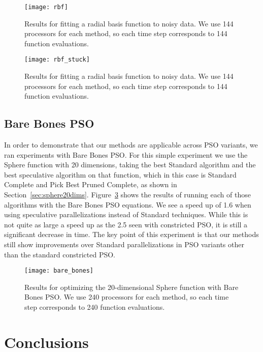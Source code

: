 \documentclass[smallcondensed]{svjour3}
\renewcommand{\sec}[1]{Section~\ref{sec:#1}}
\newcommand{\fig}[1]{Figure~\ref{fig:#1}}
\begin{document}
\begin{figure}
  \centering
  \texttt{[image: rbf]}
  \caption{Results for fitting a radial basis function to noisy data.  We use
  144 processors for each method, so each time step corresponds to 144 function
  evaluations.}
  \label{fig:rbf}
\end{figure}

\begin{figure}
  \centering
  \texttt{[image: rbf\_stuck]}
  \caption{Results for fitting a radial basis function to noisy data.  We use
  144 processors for each method, so each time step corresponds to 144 function
  evaluations.}
  \label{fig:rbf-stuck}
\end{figure}

\subsection{Bare Bones PSO}
\label{sec:bare-results}

In order to demonstrate that our methods are applicable across PSO variants, we
ran experiments with Bare Bones PSO.  For this simple experiment we use the
Sphere function with 20 dimensions, taking the best Standard algorithm and the
best speculative algorithm on that function, which in this case is Standard
Complete and Pick Best Pruned Complete, as shown in \sec{sphere20dims}.
\fig{bare-bones} shows the results of running each of those algorithms with the
Bare Bones PSO equations.  We see a speed up of 1.6 when using speculative
parallelizations instead of Standard techniques.  While this is not quite as
large a speed up as the 2.5 seen with constricted PSO, it is still a
significant decrease in time.  The key point of this experiment is that our
methods still show improvements over Standard parallelizations in PSO variants
other than the standard constricted PSO.

\begin{figure}
  \centering
  \texttt{[image: bare\_bones]}
  \caption{Results for optimizing the 20-dimensional Sphere function with Bare
  Bones PSO.  We use 240 processors for each method, so each time step
  corresponds to 240 function evaluations.}
  \label{fig:bare-bones}
\end{figure}

\section{Conclusions}
\label{sec:conclusion}
\end{document}
